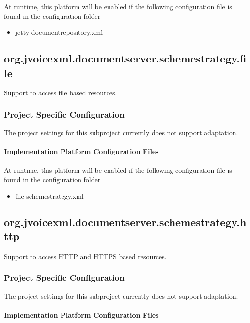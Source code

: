 \documentclass[11pt,a4paper]{article}
\begin{document}
At runtime, this platform will be enabled if the following configuration file is found in the configuration
folder
\begin{itemize}
\item jetty-documentrepository.xml
\end{itemize}

\subsection{org.jvoicexml.documentserver.schemestrategy.file}

Support to access file based resources.

\subsubsection{Project Specific Configuration}

The project settings for this subproject currently does not support adaptation.

\paragraph{Implementation Platform Configuration Files}

At runtime, this platform will be enabled if the following configuration file is found in the configuration
folder
\begin{itemize}
\item file-schemestrategy.xml
\end{itemize}

\subsection{org.jvoicexml.documentserver.schemestrategy.http}

Support to access HTTP and HTTPS based resources.

\subsubsection{Project Specific Configuration}

The project settings for this subproject currently does not support adaptation.

\paragraph{Implementation Platform Configuration Files}
\end{document}
